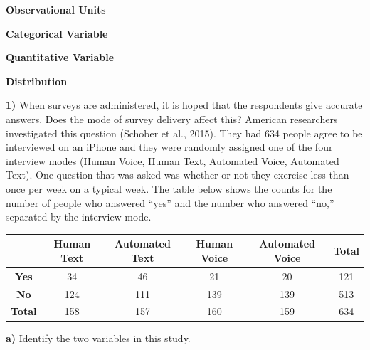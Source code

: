 \documentclass{article}
\newif\ifPrintSolution
\newcommand{\sol}[1]{\ifPrintSolution {\color{blue} #1 } \fi}
\begin{document}
\hspace{0.1in} \textbf{Observational Units}

\vfill
\sol{These individual entities on which data are recorded}

\hspace{0.1in} \textbf{Categorical Variable}

\vfill
\sol{Variables with non-numeric values or with which arithmetic cannot be done}

\hspace{0.1in} \textbf{Quantitative Variable}

\vfill
\sol{Variables with numeric values with which arithmetic can be done}

\hspace{0.1in} \textbf{Distribution}

\vfill
\sol{The pattern of outcomes of a variable}

\pagebreak

\textbf{1) } \hspace{0.1in} When surveys are administered, it is hoped that the respondents give accurate answers. Does the mode of survey delivery affect this? American researchers investigated this question (Schober et al., 2015). They had 634 people agree to be interviewed on an iPhone and they were randomly assigned one of the four interview modes (Human Voice, Human Text, Automated Voice, Automated Text). One question that was asked was whether or not they exercise less than once per week on a typical week. The table below shows the counts for the number of people who answered “yes” and the number who answered “no,” separated by the interview mode.

\begin{table}[htbp]
\begin{center}
\begin{tabular}{|c|c|c|c|c|c|}
\hline
& \textbf{Human Text} & \textbf{Automated Text} & \textbf{Human Voice} & \textbf{Automated Voice} & \textbf{Total}\\
\hline
\textbf{Yes} & 34 & 46 & 21 & 20 & 121\\
\hline
\textbf{No} & 124 & 111 & 139 & 139 & 513\\
\hline
\textbf{Total} & 158 & 157 & 160 & 159 & 634\\
\hline
\end{tabular}
\end{center}
\end{table}

\hspace{0.1in} \textbf{a) } Identify the two variables in this study.
\end{document}
